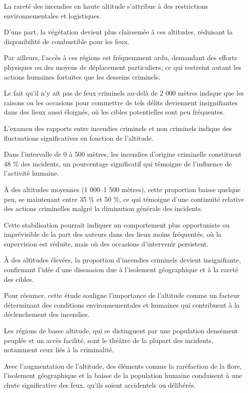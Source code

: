 \documentclass[
]{article}
\begin{document}
La rareté des incendies en haute altitude s'attribue à des restrictions
environnementales et logistiques.

D'une part, la végétation devient plus clairsemée à ces altitudes,
réduisant la disponibilité de combustible pour les feux.

Par ailleurs, l'accès à ces régions est fréquemment ardu, demandant des
efforts physiques ou des moyens de déplacement particuliers, ce qui
restreint autant les actions humaines fortuites que les desseins
criminels.

Le fait qu'il n'y ait pas de feux criminels au-delà de 2 000 mètres
indique que les raisons ou les occasions pour commettre de tels délits
deviennent insignifiantes dans des lieux aussi éloignés, où les cibles
potentielles sont peu fréquentes.

L'examen des rapports entre incendies criminels et non criminels indique
des fluctuations significatives en fonction de l'altitude.

Dans l'intervalle de 0 à 500 mètres, les incendies d'origine criminelle
constituent 48 \% des incidents, un pourcentage significatif qui
témoigne de l'influence de l'activité humaine.

À des altitudes moyennes (1 000--1 500 mètres), cette proportion baisse
quelque peu, se maintenant entre 35 \% et 50 \%, ce qui témoigne d'une
continuité relative des actions criminelles malgré la diminution
générale des incidents.

Cette stabilisation pourrait indiquer un comportement plus opportuniste
ou imprévisible de la part des auteurs dans des lieux moins fréquentés,
où la supervision est réduite, mais où des occasions d'intervenir
persistent.

À des altitudes élevées, la proportion d'incendies criminels devient
insignifiante, confirmant l'idée d'une dissuasion due à l'isolement
géographique et à la rareté des cibles.

Pour résumer, cette étude souligne l'importance de l'altitude comme un
facteur déterminant des conditions environnementales et humaines qui
contribuent à la déclenchement des incendies.

Les régions de basse altitude, qui se distinguent par une population
densément peuplée et un accès facilité, sont le théâtre de la plupart
des incidents, notamment ceux liés à la criminalité.

Avec l'augmentation de l'altitude, des éléments comme la raréfaction de
la flore, l'isolement géographique et la baisse de la population humaine
conduisent à une chute significative des feux, qu'ils soient accidentels
ou délibérés.
\end{document}
